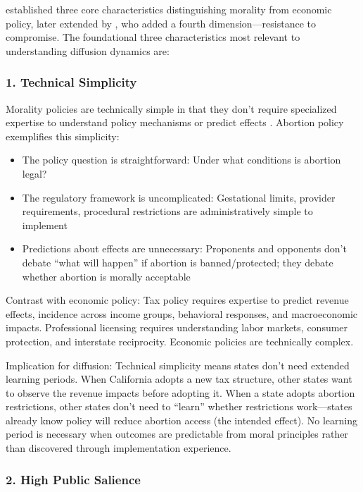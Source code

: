 \textcite{mooneyLegislativeMoralityAmerican1995,mooneyInfluenceValuesConsensus2000} established three core characteristics distinguishing morality from economic policy, later extended by \textcite{mooneyDoesMoralityPolicy2008a}, who added a fourth dimension---resistance to compromise. The foundational three characteristics most relevant to understanding diffusion dynamics are:

\subsubsection{1. Technical Simplicity}

Morality policies are technically simple in that they don't require specialized expertise to understand policy mechanisms or predict effects \parencite{mooneyLegislativeMoralityAmerican1995}. Abortion policy exemplifies this simplicity:

\begin{itemize}
\item The policy question is straightforward: Under what conditions is abortion legal?
\item The regulatory framework is uncomplicated: Gestational limits, provider requirements, procedural restrictions are administratively simple to implement
\item Predictions about effects are unnecessary: Proponents and opponents don't debate ``what will happen'' if abortion is banned/protected; they debate whether abortion is morally acceptable
\end{itemize}

Contrast with economic policy: Tax policy requires expertise to predict revenue effects, incidence across income groups, behavioral responses, and macroeconomic impacts. Professional licensing requires understanding labor markets, consumer protection, and interstate reciprocity. Economic policies are technically complex.

Implication for diffusion: Technical simplicity means states don't need extended learning periods. When California adopts a new tax structure, other states want to observe the revenue impacts before adopting it. When a state adopts abortion restrictions, other states don't need to ``learn'' whether restrictions work---states already know policy will reduce abortion access (the intended effect). No learning period is necessary when outcomes are predictable from moral principles rather than discovered through implementation experience.

\subsubsection{2. High Public Salience}


